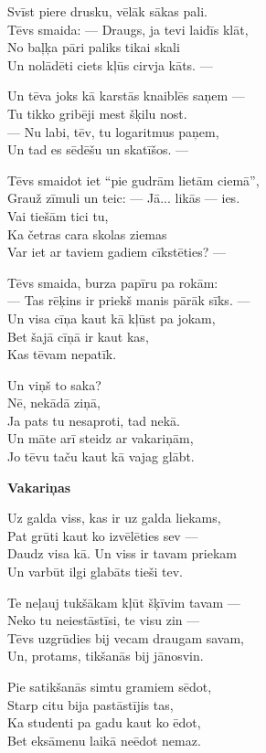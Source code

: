 \documentclass[14pt]{extarticle}
\begin{document}
{{Svīst piere drusku, vēlāk sākas pali.\\
Tēvs smaida: --- Draugs, ja tevi laidīs klāt,\\
No baļķa pāri paliks tikai skali\\
Un nolādēti ciets kļūs cirvja kāts. ---

Un tēva joks kā karstās knaiblēs saņem ---\\
Tu tikko gribēji mest šķilu nost.\\
--- Nu labi, tēv, tu logaritmus paņem,\\
Un tad es sēdēšu un skatīšos. --- 

Tēvs smaidot iet ``pie gudrām lietām ciemā'',\\
Grauž zīmuli un teic: --- Jā... likās --- ies.\\
Vai tiešām tici tu,\\
Ka četras cara skolas ziemas\\
Var iet ar taviem gadiem cīkstēties? --- 

Tēvs smaida, burza papīru pa rokām:\\
--- Tas rēķins ir priekš manis pārāk sīks. ---\\
Un visa cīņa kaut kā kļūst pa jokam,\\
Bet šajā cīņā ir kaut kas,\\
Kas tēvam nepatīk. 

Un viņš to saka?\\
Nē, nekādā ziņā,\\
Ja pats tu nesaproti, tad nekā.\\
Un māte arī steidz ar vakariņām,\\
Jo tēvu taču kaut kā vajag glābt.


\newpage

{\bf Vakariņas}

Uz galda viss, kas ir uz galda liekams,\\
Pat grūti kaut ko izvēlēties sev ---\\
Daudz visa kā. Un viss ir tavam priekam\\
Un varbūt ilgi glabāts tieši tev. 

Te neļauj tukšākam kļūt šķīvim tavam ---\\
Neko tu neiestāstīsi, te visu zin ---\\
Tēvs uzgrūdies bij vecam draugam savam,\\
Un, protams, tikšanās bij jānosvin. 

Pie satikšanās simtu gramiem sēdot,\\
Starp citu bija pastāstījis tas,\\
Ka studenti pa gadu kaut ko ēdot,\\
Bet eksāmenu laikā neēdot nemaz. 

}}
\end{document}
